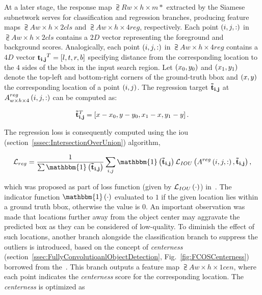 At a later stage, the response map $\supsub{R}{w \times h \times m}{*}$ extracted by the Siamese subnetwork serves for classification and regression branches, producing feature maps $\supsub{A}{w \times h \times 2}{cls}$ and $\supsub{A}{w \times h \times 4}{reg}$, respectively. Each point $\left( {i, j, :} \right)$ in $\supsub{A}{w \times h \times 2}{cls}$ contains a $2D$ vector representing the foreground and background scores. Analogically, each point $\left( {i, j, :} \right)$ in $\supsub{A}{w \times h \times 4}{reg}$ contains a $4D$ vector ${\mathbf{t_{i, j}}}^T = \left[ {l, t, r, b} \right]$ specifying distance from the corresponding location to the $4$ sides of the \gls{bbox} in the input search region. Let $\left( {x_0, y_0} \right)$ and $\left( {x_1, y_1} \right)$ denote the top-left and bottom-right corners of the ground-truth \gls{bbox} and $\left( {x, y} \right)$ the corresponding location of a point $\left( {i, j} \right)$. The regression target $\mathbf{\tilde{t}_{i, j}}$ at ${A}_{w \times h \times 4}^{reg} \left( {i, j, :} \right)$ can be computed as:

\begin{equation}
    {\mathbf{\tilde{t}_{i, j}}}^T = \left[ {x - x_0, y - y_0, x_1 - x, y_1 - y} \right].
\end{equation}

\noindent The regression loss is consequently computed using the \gls{iou} (section~\ref{sssec:IntersectionOverUnion}) algorithm,

\begin{equation}
    \label{eq:SiamCARRegLoss}
    \mathcal{L}_{reg} =
    \frac{1}{\sum \func{\mathbbm{1}}{\vect{\tilde{t}_{i, j}}}}
    \sum_{i, j}
    \func{\mathbbm{1}}{\vect{\tilde{t}_{i, j}}}
    \func{\mathcal{L}_{IOU}}{\func{A^{reg}}{i, j, :}, \vect{\tilde{t}_{i, j}}},
\end{equation}

which was proposed as part of loss function (given by ${\mathcal{L}_{IOU}} \left( \cdot \right)$) in~\cite{Yu2016}. The indicator function $\func{\mathbbm{1}}{\cdot}$ evaluated to $1$ if the given location lies within a ground truth \gls{bbox}, otherwise the value is $0$. An important observation was made that locations further away from the object center may aggravate the predicted box as they can be considered of low-quality. To diminish the effect of such locations, another branch alongside the classification branch to suppress the outliers is introduced, based on the concept of \emph{centerness} (section~\ref{ssec:FullyConvolutioanlObjectDetection}, Fig.~\ref{fig:FCOSCenterness}) borrowed from the~\cite{Tian2019}. This branch outputs a feature map $\supsub{A}{w \times h \times 1}{cen}$, where each point indicates the \emph{centerness} score for the corresponding location. The \emph{centerness} is optimized as

